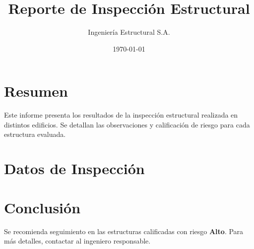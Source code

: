 \documentclass[a4paper,12pt]{article}
\title{Reporte de Inspección Estructural}
\author{Ingeniería Estructural S.A.}
\date{\today}
\begin{document}
	
	\maketitle
	
	\section*{Resumen}
	Este informe presenta los resultados de la inspección estructural realizada en distintos edificios. Se detallan las observaciones y calificación de riesgo para cada estructura evaluada.
	
	\section*{Datos de Inspección}
	\begin{table}[h]
		\caption{Resultados de inspección.}
		\centering
	\end{table}

	
	\section*{Conclusión}
	Se recomienda seguimiento en las estructuras calificadas con riesgo \textbf{Alto}. Para más detalles, contactar al ingeniero responsable.
	
\end{document}

